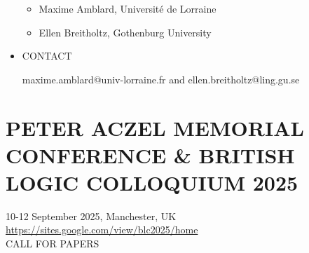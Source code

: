 \documentclass[prodmode,acmtecs]{acmsmall} %
\begin{document}
\begin{itemize}
\begin{itemize}\item  Maxime Amblard, Université de Lorraine
\item  Ellen Breitholtz, Gothenburg University
\end{itemize} 
\item  CONTACT  
 
  maxime.amblard@univ-lorraine.fr and ellen.breitholtz@ling.gu.se 
 
\end{itemize}\section{PETER ACZEL MEMORIAL CONFERENCE \& BRITISH LOGIC COLLOQUIUM 2025 }\label{PETERACZELMEMORIALCONFERENCEBRITISHLOGICCOLLOQUIUM2025}  10-12 September 2025, Manchester, UK\\ 
  \href{https://sites.google.com/view/blc2025/home}{https://sites.google.com/view/blc2025/home}\\ 
CALL FOR PAPERS 
\end{document}

